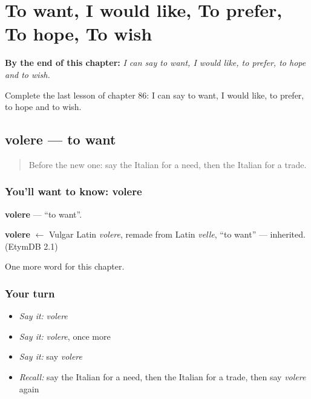 
\chapter{To want, I would like, To prefer, To hope, To wish}
\label{ch:it-to-want-i-would-like-to-prefer-to-hope-to-wish}

\begin{chapteropening}
\textbf{By the end of this chapter:} \emph{I can say to want, I would like, to prefer, to hope and to wish.}

Complete the last lesson of chapter 86: I can say to want, I would like, to prefer, to hope and to wish.
\end{chapteropening}

\section[volere]{volere — to want}

\label{lesson:IT-C86-volere}



\begin{quote}
Before the new one: say the Italian for a need, then the Italian for a trade.
\end{quote}

\subsection*{You'll want to know: volere}
\textbf{volere} — \textquotedblleft{}to want\textquotedblright{}.

\begin{cousinweb}
\textbf{volere} $\leftarrow$ Vulgar Latin \emph{volere}, remade from Latin \emph{velle}, \textquotedblleft{}to want\textquotedblright{} — inherited. (EtymDB 2.1)
\end{cousinweb}

\begin{grammarlens}[title={What you've built}]
One more word for this chapter.
\end{grammarlens}

\subsection*{Your turn}
\begin{itemize}
\raggedright
  \item \emph{Say it:} \emph{volere}
  \item \emph{Say it:} \emph{volere}, once more
  \item \emph{Say it:} say \emph{volere}
  \item \emph{Recall:} say the Italian for a need, then the Italian for a trade, then say \emph{volere} again
\end{itemize}

